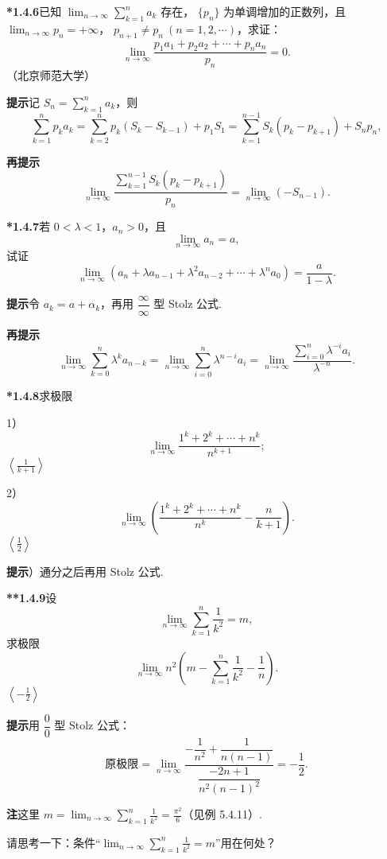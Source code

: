 \documentclass[UTF8,12pt,a4paper,fontset=fandol]{ctexart}
\begin{document}
\noindent\textbf{*1.4.6}\quad 已知 $\displaystyle\lim_{n\to\infty}\sum_{k=1}^n a_k$ 存在，
$\{p_n\}$ 为单调增加的正数列，且 $\displaystyle\lim_{n\to\infty}p_n=+\infty$，
$p_{n+1}\ne p_n\ (n=1,2,\cdots)$，求证：
\[
  \lim_{n\to\infty}\frac{p_1a_1+p_2a_2+\cdots+p_na_n}{p_n}=0.
\]
（北京师范大学）

\noindent\textbf{提示}\quad 记 $S_n=\sum_{k=1}^n a_k$，则
\[
  \sum_{k=1}^np_ka_k
  =\sum_{k=2}^np_k(S_k-S_{k-1})+p_1S_1
  =\sum_{k=1}^{n-1}S_k(p_k-p_{k+1})+S_np_n,
\]

\noindent\textbf{再提示}\quad
\[
  \lim_{n\to\infty}
  \frac{\displaystyle\sum_{k=1}^{n-1}S_k(p_k-p_{k+1})}{p_n}
  =\lim_{n\to\infty}(-S_{n-1}).
\]

\noindent\textbf{*1.4.7}\quad 若 $0<\lambda<1$，$a_n>0$，且
\[
  \lim_{n\to\infty}a_n=a,
\]
试证
\[
  \lim_{n\to\infty}(a_n+\lambda a_{n-1}+\lambda^2a_{n-2}+\cdots+\lambda^na_0)
  =\frac{a}{1-\lambda}.
\]

\noindent\textbf{提示}\quad 令 $a_k=a+\alpha_k$，再用 $\dfrac\infty\infty$ 型 Stolz 公式.

\noindent\textbf{再提示}\quad
\[
  \lim_{n\to\infty}\sum_{k=0}^n\lambda^ka_{n-k}
  =\lim_{n\to\infty}\sum_{i=0}^n\lambda^{n-i}a_i
  =\lim_{n\to\infty}
  \frac{\displaystyle\sum_{i=0}^n\lambda^{-i}a_i}{\lambda^{-n}}.
\]

\noindent\textbf{*1.4.8}\quad 求极限

1）
\[
  \lim_{n\to\infty}\frac{1^k+2^k+\cdots+n^k}{n^{k+1}};
\]
\quad $\left\langle\frac1{k+1}\right\rangle$

2）
\[
  \lim_{n\to\infty}\left(\frac{1^k+2^k+\cdots+n^k}{n^k}-\frac n{k+1}\right).
\]
\quad $\left\langle\frac12\right\rangle$

\noindent\textbf{提示}）通分之后再用 Stolz 公式.

\noindent\textbf{**1.4.9}\quad 设
\[
  \lim_{n\to\infty}\sum_{k=1}^n\frac1{k^2}=m,
\]
求极限
\[
  \lim_{n\to\infty}n^2\left(m-\sum_{k=1}^n\frac1{k^2}-\frac1n\right).
\]
\quad $\left\langle-\frac12\right\rangle$

\noindent\textbf{提示}\quad 用 $\dfrac00$ 型 Stolz 公式：
\[
  \text{原极限}
  =\lim_{n\to\infty}
  \frac{-\dfrac1{n^2}+\dfrac1{n(n-1)}}{\dfrac{-2n+1}{n^2(n-1)^2}}
  =-\frac12.
\]

\noindent\textbf{注}\quad 这里 $\displaystyle m=\lim_{n\to\infty}\sum_{k=1}^n\frac1{k^2}=\frac{\pi^2}{6}$（见例 5.4.11）.

请思考一下：条件“$\displaystyle\lim_{n\to\infty}\sum_{k=1}^n\frac1{k^2}=m$”用在何处？
\end{document}
